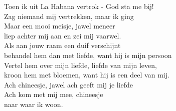 \begin{translation}
Toen ik uit La Habana vertrok - God sta me bij!\\
Zag niemand mij vertrekken, maar ik ging\\
Maar een mooi meisje, jawel meneer\\
liep achter mij aan en zei mij vaarwel.\\
\vspace*{1\baselineskip}
Als aan jouw raam een duif verschijnt\\
behandel hem dan met liefde, want hij is mijn persoon\\
Vertel hem over mijn liefde, liefde van mijn leven,\\
kroon hem met bloemen, want hij is een deel van mij.\\
\vspace*{1\baselineskip}
Ach chineesje, jawel ach geeft mij je liefde\\
Ach kom met mij mee, chineesje\\
naar waar ik woon.
\end{translation}
